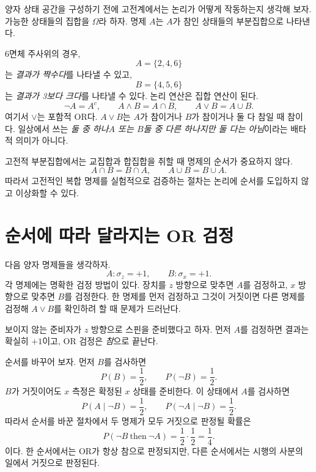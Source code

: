 양자 상태 공간을 구성하기 전에 고전계에서는 논리가 어떻게 작동하는지 생각해 보자. 가능한 상태들의 집합을 \(\Omega\)라 하자. 명제 \(A\)는 \(A\)가 참인 상태들의 부분집합으로 나타낸다.

6면체 주사위의 경우,
\[
A=\{2,4,6\}
\]
는 \emph{결과가 짝수다}를 나타낼 수 있고,
\[
B=\{4,5,6\}
\]
는 \emph{결과가 3보다 크다}를 나타낼 수 있다. 논리 연산은 집합 연산이 된다.
\begin{equation}
\neg A=A^c,\qquad
A\land B=A\cap B,\qquad
A\lor B=A\cup B.
\label{eq:classical-logic}
\end{equation}
여기서 \(\lor\)는 포함적 OR다. \(A\lor B\)는 \(A\)가 참이거나 \(B\)가 참이거나 둘 다 참일 때 참이다. 일상에서 쓰는 \emph{둘 중 하나\(A\) 또는 \(B\)둘 중 다른 하나지만 둘 다는 아님}이라는 배타적 의미가 아니다.

\begin{classroomqa}
\end{classroomqa}

고전적 부분집합에서는 교집합과 합집합을 취할 때 명제의 순서가 중요하지 않다.
\[
A\cap B=B\cap A,\qquad A\cup B=B\cup A.
\]
따라서 고전적인 복합 명제를 실험적으로 검증하는 절차는 논리에 순서를 도입하지 않고 이상화할 수 있다.

\section{순서에 따라 달라지는 OR 검정}

다음 양자 명제들을 생각하자.
\begin{equation}
A:\sigma_z=+1,\qquad B:\sigma_x=+1.
\end{equation}
각 명제에는 명확한 검정 방법이 있다. 장치를 \(z\) 방향으로 맞추면 \(A\)를 검정하고, \(x\) 방향으로 맞추면 \(B\)를 검정한다. 한 명제를 먼저 검정하고 그것이 거짓이면 다른 명제를 검정해 \(A\lor B\)를 확인하려 할 때 문제가 드러난다.

보이지 않는 준비자가 \(z\) 방향으로 스핀을 준비했다고 하자. 먼저 \(A\)를 검정하면 결과는 확실히 \(+1\)이고, OR 검정은 \emph{참}으로 끝난다.

순서를 바꾸어 보자. 먼저 \(B\)를 검사하면
\[
P(B)=\frac12,\qquad P(\neg B)=\frac12.
\]
\(B\)가 거짓이어도 \(x\) 측정은 확정된 \(x\) 상태를 준비한다. 이 상태에서 \(A\)를 검사하면
\[
P(A\mid \neg B)=\frac12,\qquad
P(\neg A\mid \neg B)=\frac12.
\]
따라서 순서를 바꾼 절차에서 두 명제가 모두 거짓으로 판정될 확률은
\begin{equation}
P(\neg B\ \text{then}\ \neg A)
=\frac12\cdot\frac12=\frac14.
\end{equation}
이다. 한 순서에서는 OR가 항상 참으로 판정되지만, 다른 순서에서는 시행의 사분의 일에서 거짓으로 판정된다.

